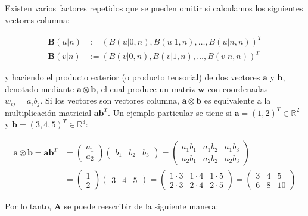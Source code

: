 Existen varios factores repetidos que se pueden omitir si calculamos los siguientes vectores columna:

\begin{align}
	\mathbf{B}(u|n) &:= (B(u|0,n), B(u|1,n), \ldots, B(u|n,n))^T \\
	\mathbf{B}(v|n) &:= (B(v|0,n), B(v|1,n), \ldots, B(v|n,n))^T
	\label{eq:bernsteinsBasis}
\end{align}

\noindent
y haciendo el producto exterior (o producto tensorial) de dos vectores $\mathbf{a}$ y $\mathbf{b}$, denotado mediante $\mathbf{a} \otimes \mathbf{b}$, el cual produce un matriz $\mathbf{w}$ con coordenadas $w_{ij}= a_i b_j$. Si los vectores son vectores columna, $\mathbf{a} \otimes \mathbf{b}$ es equivalente a la multiplicaci\'on matricial $\mathbf{a}\mathbf{b}^T$. Un ejemplo particular se tiene si $\mathbf{a}=(1,2)^T \in \mathbb{R}^2$ y $\mathbf{b}=(3,4,5)^T \in \mathbb{R}^3$:

\begin{align}
	\mathbf{a} \otimes \mathbf{b}
	=
	\mathbf{a} \mathbf{b}^T
	&=
		\begin{pmatrix}
			a_1 \\ a_2
		\end{pmatrix}
		\begin{pmatrix}
			b_1 & b_2 & b_3
		\end{pmatrix}
	=
		\begin{pmatrix}
			a_1 b_1 & a_1 b_2 & a_1 b_3 \\
			a_2 b_1 & a_2 b_2 & a_2 b_3
		\end{pmatrix} \\
	&=
		\begin{pmatrix}
			1 \\ 2
		\end{pmatrix}
		\begin{pmatrix}
			3 & 4 & 5
		\end{pmatrix}
	=
		\begin{pmatrix}
			1 \cdot 3 & 1 \cdot 4 & 1 \cdot 5 \\
			2 \cdot 3 & 2 \cdot 4 & 2 \cdot 5
		\end{pmatrix}
	=
		\begin{pmatrix}
			3 & 4 & 5 \\
			6 & 8 & 10
		\end{pmatrix}
		\label{e:tensorProd2D}
\end{align}

Por lo tanto, $\mathbf{A}$ se puede reescribir de la siguiente manera:


